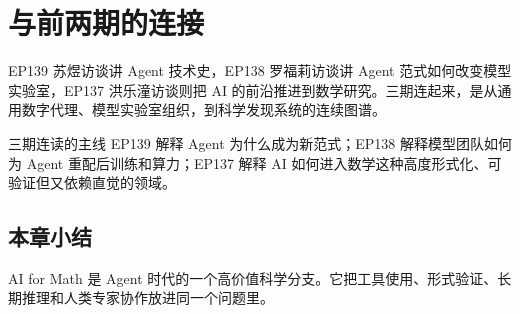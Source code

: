 \section{与前两期的连接}

EP139 苏煜访谈讲 Agent 技术史，EP138 罗福莉访谈讲 Agent 范式如何改变模型实验室，EP137 洪乐潼访谈则把 AI 的前沿推进到数学研究。三期连起来，是从通用数字代理、模型实验室组织，到科学发现系统的连续图谱。

\begin{importantbox}{三期连读的主线}
EP139 解释 Agent 为什么成为新范式；EP138 解释模型团队如何为 Agent 重配后训练和算力；EP137 解释 AI 如何进入数学这种高度形式化、可验证但又依赖直觉的领域。
\end{importantbox}

\subsection{本章小结}

AI for Math 是 Agent 时代的一个高价值科学分支。它把工具使用、形式验证、长期推理和人类专家协作放进同一个问题里。



